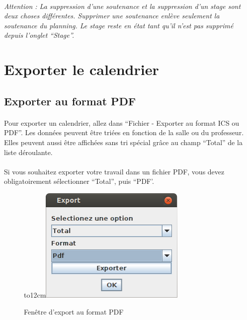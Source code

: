 \documentclass[a4paper,10pt]{report}
\begin{document}
	
      \paragraph{}
	\textit{Attention : La suppression d'une soutenance et la suppression d'un stage sont deux choses différentes. Supprimer une soutenance enlève seulement la soutenance du planning. Le stage reste en état tant qu'il n'est pas supprimé depuis l'onglet ``Stage''.}
      
     \newpage
    \section{Exporter le calendrier}
      \subsection{Exporter au format PDF}
      
	\paragraph{}
	  Pour exporter un calendrier, allez dans ``Fichier - Exporter au format ICS ou PDF''.
	  Les données peuvent être triées en fonction de la salle ou du professeur.
	  Elles peuvent aussi être affichées sans tri spécial grâce au champ ``Total'' de la liste déroulante.
	  
	\paragraph{}
	  Si vous souhaitez exporter votre travail dans un fichier PDF, vous devez obligatoirement sélectionner ``Total'', puis ``PDF'.
	  
	  \begin{figure}[H]
	    \hbox to12cm{\hss\includegraphics[width=7cm]{../general/exportpdf.png}\hss}
	    \caption{Fenêtre d'export au format PDF}
	  \end{figure}
	  
\end{document}
